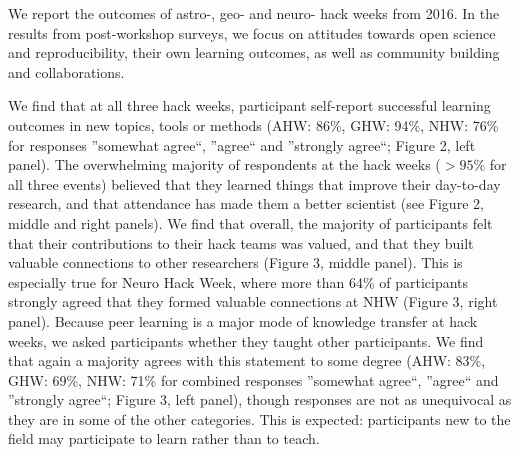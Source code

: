 We report the outcomes of astro-, geo- and neuro- hack weeks from 2016. In the results from post-workshop surveys, we focus on attitudes towards open science and reproducibility, their own learning outcomes, as well as community building and collaborations.

We find that at all three hack weeks, participant self-report successful learning outcomes in new topics, tools or methods (AHW: 86\%, GHW: 94\%, NHW: 76\% for responses ''somewhat agree``, ''agree`` and ''strongly agree``; Figure 2, left panel).
The overwhelming majority of respondents at the hack weeks ($>95\%$ for all three events) believed that they learned things that improve their day-to-day research, and that attendance has made them a better scientist (see Figure 2, middle and right panels).
We find that overall, the majority of participants felt that their contributions to their hack teams was valued, and that they built valuable connections to other researchers (Figure 3, middle panel).
This is especially true for Neuro Hack Week, where more than 64\% of participants strongly agreed that they formed valuable connections at NHW (Figure 3, right panel).
Because peer learning is a major mode of knowledge transfer at hack weeks, we asked participants whether they taught other participants.
We find that again a majority agrees with this statement to some degree (AHW: 83\%, GHW: 69\%, NHW: 71\% for combined responses ''somewhat agree``, ''agree`` and ''strongly agree``; Figure 3, left panel), though responses are not as unequivocal as they are in some of the other categories.
This is expected: participants new to the field may participate to learn rather than to teach.

